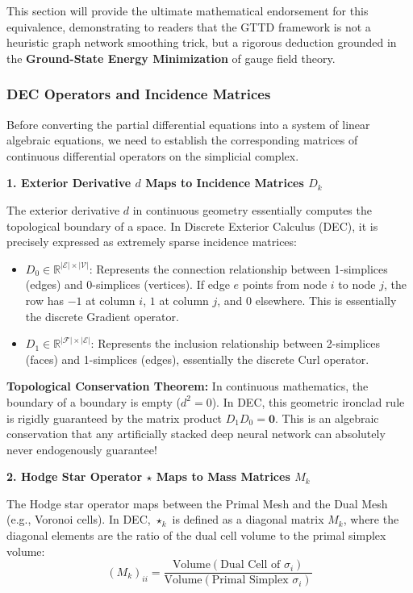 \documentclass{article}
\begin{document}
This section will provide the ultimate mathematical endorsement for this equivalence, demonstrating to readers that the GTTD framework is not a heuristic graph network smoothing trick, but a rigorous deduction grounded in the \textbf{Ground-State Energy Minimization} of gauge field theory.

\subsubsection{DEC Operators and Incidence Matrices}

Before converting the partial differential equations into a system of linear algebraic equations, we need to establish the corresponding matrices of continuous differential operators on the simplicial complex.

\noindent\textbf{1. Exterior Derivative $d$ Maps to Incidence Matrices $D_k$}

The exterior derivative $d$ in continuous geometry essentially computes the topological boundary of a space. In Discrete Exterior Calculus (DEC), it is precisely expressed as extremely sparse incidence matrices:
\begin{itemize}
    \item $D_0 \in \mathbb{R}^{|\mathcal{E}| \times |\mathcal{V}|}$: Represents the connection relationship between 1-simplices (edges) and 0-simplices (vertices). If edge $e$ points from node $i$ to node $j$, the row has $-1$ at column $i$, $1$ at column $j$, and $0$ elsewhere. This is essentially the discrete Gradient operator.
    \item $D_1 \in \mathbb{R}^{|\mathcal{F}| \times |\mathcal{E}|}$: Represents the inclusion relationship between 2-simplices (faces) and 1-simplices (edges), essentially the discrete Curl operator.
\end{itemize}

\noindent\textbf{Topological Conservation Theorem:} In continuous mathematics, the boundary of a boundary is empty ($d^2 = 0$). In DEC, this geometric ironclad rule is rigidly guaranteed by the matrix product $D_1 D_0 = \mathbf{0}$. This is an algebraic conservation that any artificially stacked deep neural network can absolutely never endogenously guarantee!

\noindent\textbf{2. Hodge Star Operator $\star$ Maps to Mass Matrices $M_k$}

The Hodge star operator maps between the Primal Mesh and the Dual Mesh (e.g., Voronoi cells). In DEC, $\star_k$ is defined as a diagonal matrix $M_k$, where the diagonal elements are the ratio of the dual cell volume to the primal simplex volume:
\begin{equation}
(M_k)_{ii} = \frac{\text{Volume}(\text{Dual Cell of } \sigma_i)}{\text{Volume}(\text{Primal Simplex } \sigma_i)}
\end{equation}
\end{document}
